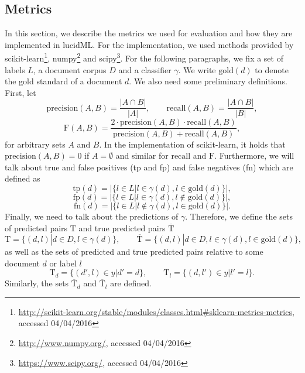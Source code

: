 \documentclass{article}
\begin{document}
\subsection{Metrics}\label{metrics}
In this section, we describe the metrics we used for evaluation and how they are implemented in lucidML. For the implementation, we used methods
provided by scikit-learn\footnote{
  \url{http://scikit-learn.org/stable/modules/classes.html#sklearn-metrics-metrics}, accessed 04/04/2016}, numpy\footnote{
  \url{http://www.numpy.org/}, accessed 04/04/2016} and scipy\footnote{
  \url{https://www.scipy.org/}, accessed 04/04/2016}.
For the following paragraphs, we fix a set of labels $L$, a document corpus $D$ and a classifier $\gamma$. We write $\mathrm{gold}(d)$ to denote the
gold standard of a document $d$. We also need some preliminary definitions. First, let
\begin{equation*}
\mathrm{precision}(A,B) = \frac{|A \cap B|}{|A|},
\qquad
\mathrm{recall}(A,B) = \frac{|A \cap B|}{|B|},
\end{equation*}
\begin{equation*}
\mathrm{F}(A,B) = \frac{2 \cdot \mathrm{precision}(A,B) \cdot \mathrm{recall}(A,B)}{\mathrm{precision}(A,B) + \mathrm{recall}(A,B)},
\end{equation*}
for arbitrary sets $A$ and $B$. In the implementation of scikit-learn, it holds that $\mathrm{precision}(A,B) = 0$ if $A = \emptyset$ and similar for
$\mathrm{recall}$ and $\mathrm{F}$. Furthermore, we will talk about true and false positives (tp and fp) and false negatives (fn) which are defined as
\begin{equation*}
\mathrm{tp}(d) = | \{l \in L | l \in \gamma(d), l \in \mathrm{gold}(d) \}|,
\end{equation*}
\begin{equation*}
\mathrm{fp}(d) = | \{l \in L | l \in \gamma(d), l \notin \mathrm{gold}(d) \}|,
\end{equation*}
\begin{equation*}
\mathrm{fn}(d) = | \{l \in L | l \notin \gamma(d), l \in \mathrm{gold}(d) \}|.
\end{equation*}
Finally, we need to talk about the predictions of $\gamma$. Therefore, we define the sets of predicted pairs $\mathrm{T}$ and true predicted
pairs $\overline{\mathrm{T}}$
\begin{equation*}
\mathrm{T} = \{(d,l) | d \in D, l \in \gamma(d) \},
\qquad
\overline{\mathrm{T}} = \{(d,l) | d \in D, l \in \gamma(d), l \in \mathrm{gold}(d) \},
\end{equation*}
as well as the sets of predicted and true predicted pairs relative to some document $d$ or label $l$
\begin{equation*}
\mathrm{T}_{d} = \{(d',l) \in y | d'=d \},
\qquad
\mathrm{T}_{l} = \{(d,l') \in y | l'=l \}.
\end{equation*}
Similarly, the sets $\overline{\mathrm{T}}_{d}$ and $\overline{\mathrm{T}}_{l}$ are defined.
\end{document}
